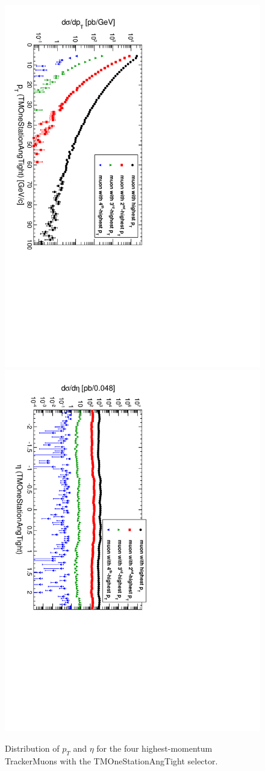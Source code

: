 \documentclass[12pt]{article}
\begin{document}
\begin{figure}
\includegraphics[height=0.5\linewidth, angle=90]{fig/backgroundsMatching_plot/ptcurves_TMOneStationAngTight.pdf}
\includegraphics[height=0.5\linewidth, angle=90]{fig/backgroundsMatching_plot/etacurves_TMOneStationAngTight.pdf}

\caption{Distribution of $p_T$ and $\eta$ for the four highest-momentum TrackerMuons with the TMOneStationAngTight selector. \label{fig:curves_TMOneStationAngTight}}
\end{figure}
\end{document}
